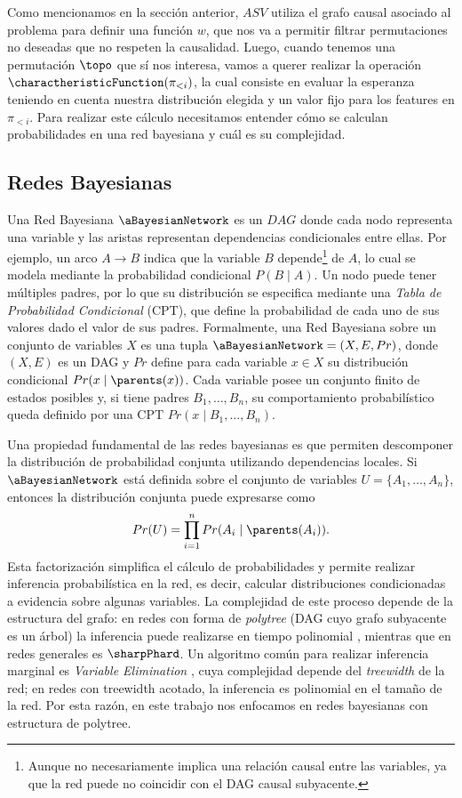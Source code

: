Como mencionamos en la sección anterior, $ASV$ utiliza el grafo causal asociado al problema para definir una función $w$, que nos va a permitir filtrar permutaciones no deseadas que no respeten la causalidad. Luego, cuando tenemos una permutación $\topo$ que sí nos interesa, vamos a querer realizar la operación $\charactheristicFunction(\pi_{<i})$, la cual consiste en evaluar la esperanza teniendo en cuenta nuestra distribución elegida y un valor fijo para los features en $\pi_{<i}$. Para realizar este cálculo necesitamos entender cómo se calculan probabilidades en una red bayesiana y cuál es su complejidad. 

\subsection{Redes Bayesianas}
Una Red Bayesiana $\aBayesianNetwork$ es un $DAG$ donde cada nodo representa una variable y las aristas representan dependencias condicionales entre ellas. Por ejemplo, un arco $A \rightarrow B$ indica que la variable $B$ depende\footnote{Aunque no necesariamente implica una relación causal entre las variables, ya que la red puede no coincidir con el DAG causal subyacente.} de $A$, lo cual se modela mediante la probabilidad condicional $P(B \mid A)$. Un nodo puede tener múltiples padres, por lo que su distribución se especifica mediante una \emph{Tabla de Probabilidad Condicional} (CPT), que define la probabilidad de cada uno de sus valores dado el valor de sus padres. Formalmente, una Red Bayesiana sobre un conjunto de variables $X$ es una tupla $\aBayesianNetwork = (X, E, Pr)$, donde $(X,E)$ es un DAG y $Pr$ define para cada variable $x \in X$ su distribución condicional $Pr(x \mid \parents(x))$. Cada variable posee un conjunto finito de estados posibles y, si tiene padres $B_1,\dots,B_n$, su comportamiento probabilístico queda definido por una CPT $Pr(x \mid B_1,\dots,B_n)$.

Una propiedad fundamental de las redes bayesianas es que permiten descomponer la distribución de probabilidad conjunta utilizando dependencias locales. Si $\aBayesianNetwork$ está definida sobre el conjunto de variables $U=\{A_1,\dots,A_n\}$, entonces la distribución conjunta puede expresarse como
\[
Pr(U) = \prod_{i=1}^{n} Pr(A_i \mid \parents(A_i)).
\]
Esta factorización simplifica el cálculo de probabilidades y permite realizar inferencia probabilística en la red, es decir, calcular distribuciones condicionadas a evidencia sobre algunas variables. La complejidad de este proceso depende de la estructura del grafo: en redes con forma de \emph{polytree} (DAG cuyo grafo subyacente es un árbol) la inferencia puede realizarse en tiempo polinomial \cite{pearl1986bayesianInference}, mientras que en redes generales es $\sharpPhard$. Un algoritmo común para realizar inferencia marginal es \emph{Variable Elimination} \cite{variableElimination}, cuya complejidad depende del \emph{treewidth} de la red; en redes con treewidth acotado, la inferencia es polinomial en el tamaño de la red. Por esta razón, en este trabajo nos enfocamos en redes bayesianas con estructura de polytree.



